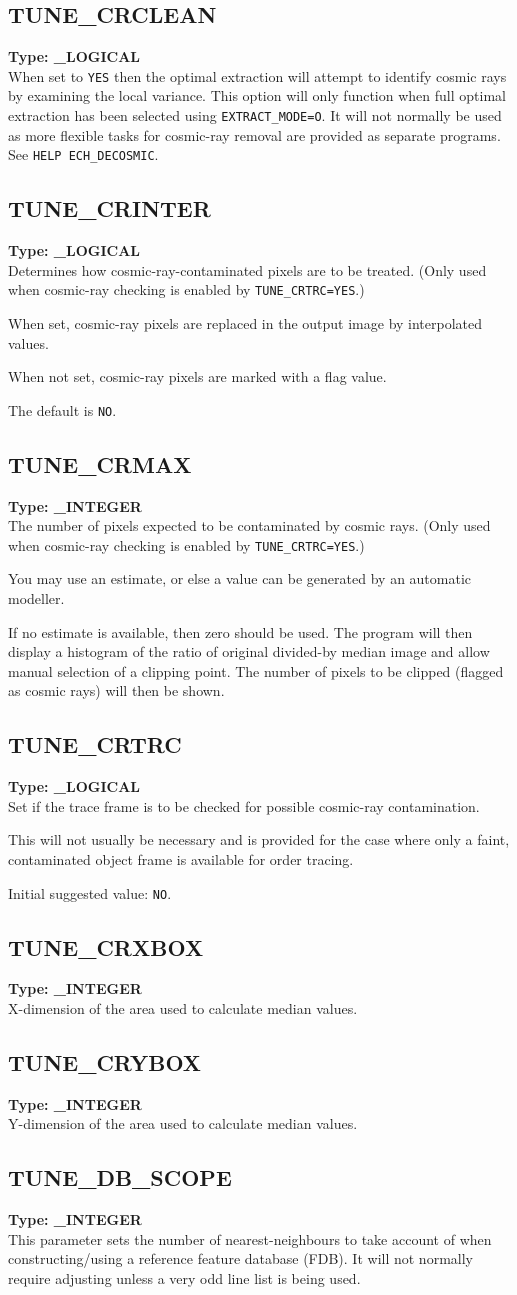 \documentclass[11pt,twoside]{article}
\makeatletter
\newcommand{\htmlref}[2]{#1}
\newcommand{\xlabel}[1]{}
\newcommand{\indexcmdname}[1]{\index{#1@\protect\cmdname{#1}}}
\renewcommand{\indexcmdname}[1]{}
\newcommand{\cmdname}{\begingroup \catcode`\_=12 \realcmdname}
\newcommand{\realcmdname}[1]{\endgroup\texttt{#1}}
\newcommand{\echparameter}[4]
{
\item [#1 = #3] \mbox{}\label{par_#2}\indexcmdname{#2}
\\
#4
}
\renewcommand{\echparameter}[4]
{
  \subsection{\xlabel{par_#2}\label{par_#2}{\bf #1}}
  {\bf Type: #3}\\
#4
}
\makeatother
\begin{document}
\echparameter{TUNE\_CRCLEAN}{TUNE_CRCLEAN}{
 \_LOGICAL
}{
 When set to \texttt{YES} then the optimal extraction will attempt to
 identify cosmic rays by examining the local variance.  This option
 will only function when full optimal extraction has been selected
 using \htmlref{{\tt EXTRACT\_MODE=O}}{par_EXTRACT_MODE}.
 It will not normally be used as more
 flexible tasks for cosmic-ray removal are provided as separate
 programs.  See {\tt HELP ECH\_DECOSMIC}.
}

\echparameter{TUNE\_CRINTER}{TUNE_CRINTER}{
 \_LOGICAL
}{
 Determines how cosmic-ray-contaminated pixels are to be treated.
 (Only used when cosmic-ray checking is enabled by
 \htmlref{{\tt TUNE\_CRTRC=YES}}{par_TUNE_CRTRC}.)

 When set, cosmic-ray pixels are replaced in the output
 image by interpolated values.

 When not set, cosmic-ray pixels are marked with a flag value.

 The default is \texttt{NO}.
}

\echparameter{TUNE\_CRMAX}{TUNE_CRMAX}{
 \_INTEGER
}{
 The number of pixels expected to be contaminated by cosmic rays.
 (Only used when cosmic-ray checking is enabled by
 \htmlref{{\tt TUNE\_CRTRC=YES}}{par_TUNE_CRTRC}.)

 You may use an estimate, or else a value can be generated by an
 automatic modeller.

 If no estimate is available, then zero should be used.  The program will
 then display a histogram of the ratio of original divided-by median image
 and allow manual selection of a clipping point.
 The number of pixels to be clipped (flagged as cosmic rays) will then be
 shown.
}

\echparameter{TUNE\_CRTRC}{TUNE_CRTRC}{
 \_LOGICAL
}{
 Set if the trace frame is to be checked for possible
 cosmic-ray contamination.

 This will not usually be necessary and is provided for the
 case where only a faint, contaminated object frame is available
 for order tracing.

 Initial suggested value: \texttt{NO}.
}

\echparameter{TUNE\_CRXBOX}{TUNE_CRXBOX}{
 \_INTEGER
}{
 X-dimension of the area used to calculate median values.
}

\echparameter{TUNE\_CRYBOX}{TUNE_CRYBOX}{
 \_INTEGER
}{
 Y-dimension of the area used to calculate median values.
}

\echparameter{TUNE\_DB\_SCOPE}{TUNE_DB_SCOPE}{
 \_INTEGER
}{
 This parameter sets the number of nearest-neighbours to take
 account of when constructing/using a reference feature database
 (FDB).  It will not normally require adjusting unless a very odd
 line list is being used.
}
\end{document}
